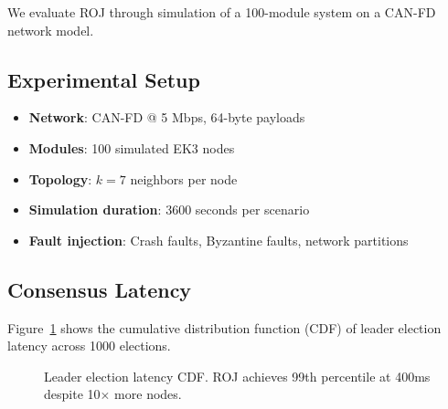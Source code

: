 \documentclass[conference,10pt]{IEEEtran}
\begin{document}
We evaluate ROJ through simulation of a 100-module system on a CAN-FD network model.

\subsection{Experimental Setup}

\begin{itemize}
    \item \textbf{Network}: CAN-FD @ 5 Mbps, 64-byte payloads
    \item \textbf{Modules}: 100 simulated EK3 nodes
    \item \textbf{Topology}: $k=7$ neighbors per node
    \item \textbf{Simulation duration}: 3600 seconds per scenario
    \item \textbf{Fault injection}: Crash faults, Byzantine faults, network partitions
\end{itemize}

\subsection{Consensus Latency}

Figure~\ref{fig:latency} shows the cumulative distribution function (CDF) of leader election latency across 1000 elections.

\begin{figure}[htbp]
\centering
{}
\caption{Leader election latency CDF. ROJ achieves 99th percentile at 400ms despite 10$\times$ more nodes.}
\label{fig:latency}
\end{figure}
\end{document}
